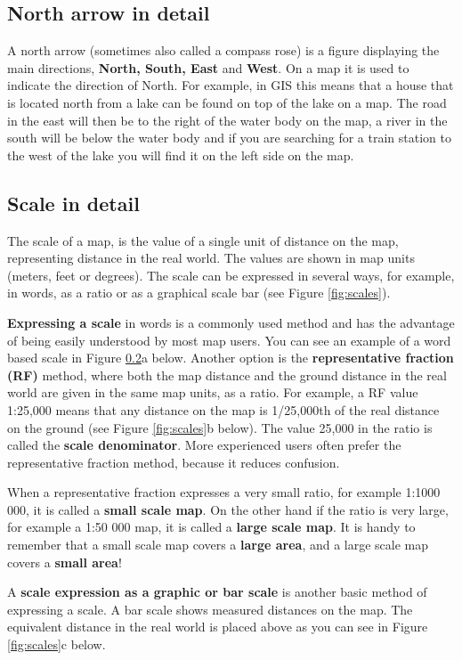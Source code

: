 \subsection{North arrow in detail}

A north arrow (sometimes also called a compass rose) is a figure displaying
the main directions, \textbf{North, South, East} and \textbf{West}. On a map
it is used to
indicate the direction of North. 
For example, in GIS this means that a house that is located north from a lake
can be found on top of the lake on a map. The road in the east will then be
to the right of the water body on the map, a river in the south will be below
the water body and if you are searching for a train station to the west of
the lake you will find it on the left side on the map. 

\subsection{Scale in detail}

The scale of a map, is the value of a single unit of distance on the map,
representing distance in the real world. The values are shown in map units
(meters, feet or degrees). The scale can be expressed in several ways, for
example, in words, as a ratio or as a graphical scale bar (see Figure
\ref{fig:scales}).

\textbf{Expressing a scale} in words is a commonly used method and has the
advantage
of being easily understood by most map users. You can see an example of a
word based scale in Figure \ref{}a below. Another option is the
\textbf{representative fraction (RF)} method, where both the map distance and the
ground distance in the real world are given in the same map units, as a
ratio. For example, a RF value 1:25,000 means that any distance on the map is
1/25,000th of the real distance on the ground (see Figure \ref{fig:scales}b below).
The value 25,000 in the ratio is called the \textbf{scale denominator}. More
experienced users often prefer the representative fraction method, because it
reduces confusion. 

When a representative fraction expresses a very small ratio, for example
1:1000 000, it is called a \textbf{small scale map}. On the other hand if the
ratio is
very large, for example a 1:50 000 map, it is called a \textbf{large scale
map}. It is
handy to remember that a small scale map covers a \textbf{large area}, and a
large scale map covers a \textbf{small area}!

A \textbf{scale expression as a graphic or bar scale} is another basic method of
expressing a scale. A bar scale shows measured distances on the map. The
equivalent distance in the real world is placed above as you can see in
Figure \ref{fig:scales}c below. 

